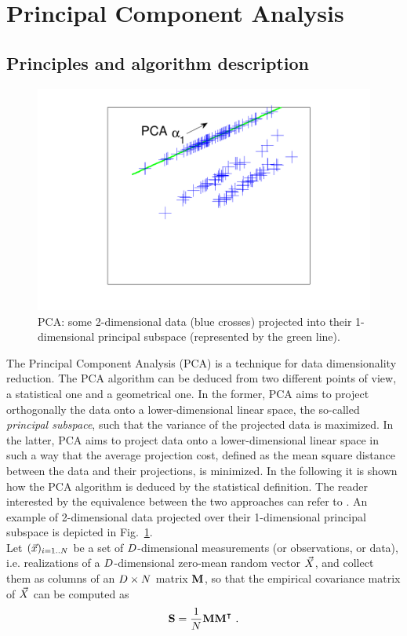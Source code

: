 
\section{Principal Component Analysis} \label{sec:PCA}
\subsection{Principles and algorithm description}
\begin{figure}
\centering
\includegraphics[width=.5\textwidth]{../Figures/PCA_LDA_geometric/PCAprojection_unsupervised.pdf} 
\caption{PCA: some 2-dimensional data (blue crosses) projected into their 1-dimensional principal subspace (represented by the green line).}\label{fig:PCAunsupervised}
\end{figure}
The Principal Component Analysis (PCA) is a technique for data dimensionality reduction. The PCA algorithm can be deduced from two different points of view, a statistical one and a geometrical one. In the former, PCA aims to project orthogonally the data onto a lower-dimensional linear space, the so-called \emph{principal subspace}, such that the variance of the projected data is maximized. In the latter, PCA aims to project data onto a lower-dimensional linear space in such a way that the average projection cost, defined as the mean square distance between the data and their projections, is minimized. In the following it is shown how the PCA algorithm is deduced by the statistical definition. The reader interested by the equivalence between the two approaches can refer to \cite[Ch.\ 12]{christopher2006pattern}. An example of 2-dimensional data projected over their 1-dimensional principal subspace is depicted in Fig.~\ref{fig:PCAunsupervised}.\\

Let $(\vec{x})_{i=1..N}$ be a set of $D$-dimensional measurements (or observations, or data), i.e. realizations of a $D$-dimensional zero-mean random vector $\vec{X}{}$, and collect them as columns of an $D \times N$ matrix $\textbf{M}$, so that the empirical covariance matrix of $\vec{X}{}$ can be computed as 
\begin{equation}\label{eq:covmat}
\textbf{S} = \frac{1}{N}\textbf{M}\textbf{M}^\intercal \mbox{ .}
\end{equation}

